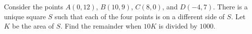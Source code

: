 Consider the points $A(0,12)$, $B(10,9)$, $C(8,0)$, and $D(-4,7)$. There is a unique square $S$ such that each of the four points is on a different side of $S$. Let $K$ be the area of $S$. Find the remainder when $10K$ is divided by $1000$.